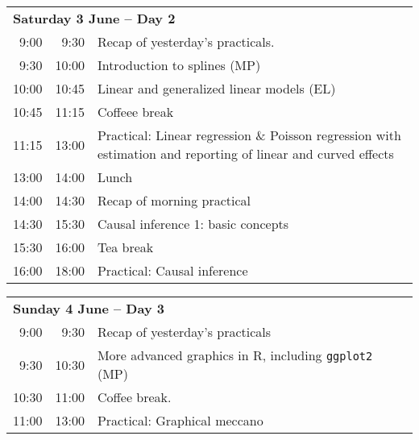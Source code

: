 \noindent
\begin{tabular}{r@{ -- }rp{13cm}}
\multicolumn{3}{l}{\bf Saturday 3 June -- Day 2} \\
 9:00 &  9:30 & Recap of yesterday's practicals. \\
 9:30 & 10:00 & Introduction to splines (MP)\\ %
10:00 & 10:45 & Linear and generalized linear models (EL)\\ %
10:45 & 11:15 & Coffeee break \\
11:15 & 13:00 & Practical: Linear regression \& Poisson regression  
                with estimation and reporting of linear and curved
                effects\\ %
13:00 & 14:00 & Lunch \\
14:00 & 14:30 & Recap of morning practical \\
14:30 & 15:30 & Causal inference 1: basic concepts\\ %
15:30 & 16:00 & Tea break\\
16:00 & 18:00 & Practical: Causal inference\\[1em] %
\end{tabular}

\noindent
\begin{tabular}{r@{ -- }rp{13cm}}
 \multicolumn{3}{l}{\bf Sunday 4 June -- Day 3} \\
 9:00 &  9:30 & Recap of yesterday's practicals \\
 9:30 & 10:30 & More advanced graphics in R, including
                \texttt{ggplot2} (MP)\\ %
10:30 & 11:00 & Coffee break. \\
11:00 & 13:00 & Practical: Graphical meccano \\[1em] %
\end{tabular}

